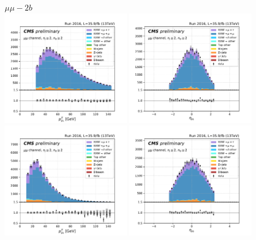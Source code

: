 \begin{figure}[ht]
    \centering
    $\mu\mu - 2b$ \\
    \includegraphics[width=0.49\textwidth]{chapters/Appendix/sectionPlots/figures/kinematics_pickles/mumu/2b/mumu_2b_lepton1_pt.pdf}
    \includegraphics[width=0.49\textwidth]{chapters/Appendix/sectionPlots/figures/kinematics_pickles/mumu/2b/mumu_2b_lepton1_eta.pdf}
    \includegraphics[width=0.49\textwidth]{chapters/Appendix/sectionPlots/figures/kinematics_pickles/mumu/2b/mumu_2b_lepton2_pt.pdf}
    \includegraphics[width=0.49\textwidth]{chapters/Appendix/sectionPlots/figures/kinematics_pickles/mumu/2b/mumu_2b_lepton2_eta.pdf}

\end{figure}
